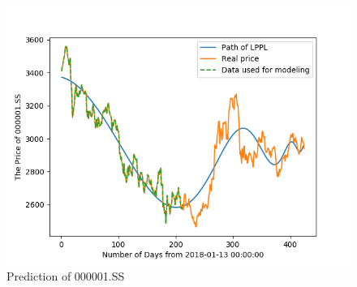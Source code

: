 \begin{figure}[H]
    \centering
    \includegraphics[width=\textwidth]{figures/2019-10-22-LPPL-2.png}
    \caption{Prediction of 000001.SS}
    \label{F:LPPL-prediction-2}
\end{figure}
